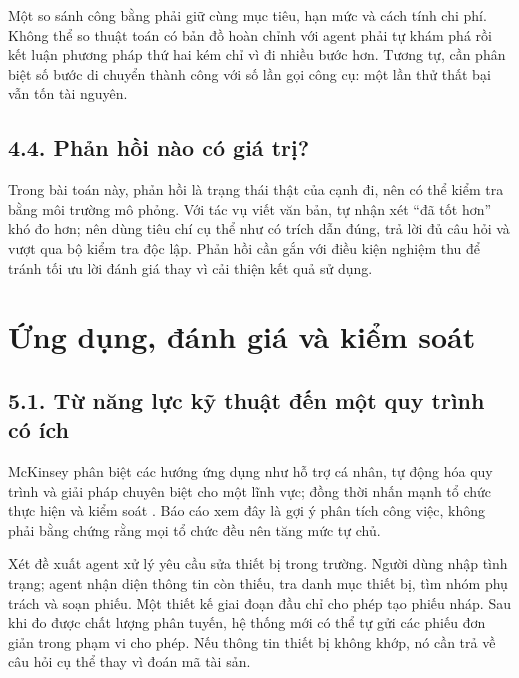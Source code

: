 \documentclass[11pt,a4paper]{article}
\begin{document}
Một so sánh công bằng phải giữ cùng mục tiêu, hạn mức và cách tính chi phí. Không thể
so thuật toán có bản đồ hoàn chỉnh với agent phải tự khám phá rồi kết luận phương pháp
thứ hai kém chỉ vì đi nhiều bước hơn. Tương tự, cần phân biệt số bước di chuyển thành
công với số lần gọi công cụ: một lần thử thất bại vẫn tốn tài nguyên.

\subsection{4.4. Phản hồi nào có giá trị?}
Trong bài toán này, phản hồi là trạng thái thật của cạnh đi, nên có thể kiểm tra bằng
môi trường mô phỏng. Với tác vụ viết văn bản, tự nhận xét ``đã tốt hơn'' khó đo hơn;
nên dùng tiêu chí cụ thể như có trích dẫn đúng, trả lời đủ câu hỏi và vượt qua bộ kiểm
tra độc lập. Phản hồi cần gắn với điều kiện nghiệm thu để tránh tối ưu lời đánh giá
thay vì cải thiện kết quả sử dụng.

\newpage
\section{Ứng dụng, đánh giá và kiểm soát}
\subsection{5.1. Từ năng lực kỹ thuật đến một quy trình có ích}
McKinsey phân biệt các hướng ứng dụng như hỗ trợ cá nhân, tự động hóa quy trình và giải
pháp chuyên biệt cho một lĩnh vực; đồng thời nhấn mạnh tổ chức thực hiện và kiểm soát
\cite{mckinsey}. Báo cáo xem đây là gợi ý phân tích công việc, không phải bằng chứng
rằng mọi tổ chức đều nên tăng mức tự chủ.

Xét đề xuất agent xử lý yêu cầu sửa thiết bị trong trường. Người dùng nhập tình trạng;
agent nhận diện thông tin còn thiếu, tra danh mục thiết bị, tìm nhóm phụ trách và soạn
phiếu. Một thiết kế giai đoạn đầu chỉ cho phép tạo phiếu nháp. Sau khi đo được chất
lượng phân tuyến, hệ thống mới có thể tự gửi các phiếu đơn giản trong phạm vi cho phép.
Nếu thông tin thiết bị không khớp, nó cần trả về câu hỏi cụ thể thay vì đoán mã tài sản.
\end{document}
